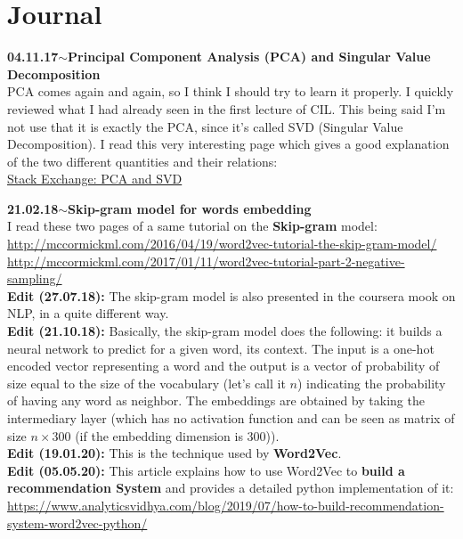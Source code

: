 \documentclass[11pt,a4paper]{article}
\newenvironment{loggentry}[2]%
{\noindent\textbf{#1}\hspace{1cm}$\mathbf{\sim}$\text{ }\textbf{#2}\\}{\vspace{0.5cm}}
\begin{document}
\section{Journal}

\begin{loggentry}{04.11.17}{Principal Component Analysis (PCA) and Singular Value Decomposition}
PCA comes again and again, so I think I should try to learn it properly. I quickly reviewed what I had already seen in the first lecture of CIL. This being said I'm not use that it is exactly the PCA, since it's called SVD (Singular Value Decomposition). I read this very interesting page which gives a good explanation of the two different quantities and their relations:\\
\href{https://stats.stackexchange.com/questions/134282/relationship-between-svd-and-pca-how-to-use-svd-to-perform-pca#134283}{Stack Exchange: PCA and SVD}\\
\end{loggentry}

\begin{loggentry}{21.02.18}{Skip-gram model for words embedding}
I read these two pages of a same tutorial on the \textbf{Skip-gram} model:\\
\url{http://mccormickml.com/2016/04/19/word2vec-tutorial-the-skip-gram-model/}\\
\url{http://mccormickml.com/2017/01/11/word2vec-tutorial-part-2-negative-sampling/}\\
\textbf{Edit (27.07.18):} The skip-gram model is also presented in the coursera mook on NLP, in a quite different way.\\
\textbf{Edit (21.10.18):} Basically, the skip-gram model does the following: it builds a neural network to predict for a given word, its context. The input is a one-hot encoded vector representing a word and the output is a vector of probability of size equal to the size of the vocabulary (let's call it $n$) indicating the probability of having any word as neighbor. The embeddings are obtained by taking the intermediary layer (which has no activation function and can be seen as matrix of size $n\times 300$ (if the embedding dimension is $300$)).\\
\textbf{Edit (19.01.20):} This is the technique used by \textbf{Word2Vec}.\\
\textbf{Edit (05.05.20):} This article explains how to use Word2Vec to \textbf{build a recommendation System} and provides a detailed python implementation of it:\\
\url{https://www.analyticsvidhya.com/blog/2019/07/how-to-build-recommendation-system-word2vec-python/}
\end{loggentry}
\end{document}

